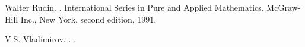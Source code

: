 \documentclass[italian,a4paper,oneside,headinclude]{scrbook}
\begin{document}

%
\begin{thebibliography}{1}

Walter Rudin.
.
\newblock International Series in Pure and Applied Mathematics. McGraw-Hill
  Inc., New York, second edition, 1991.

V.S. Vladimirov.
.
.

\end{thebibliography}

\end{document}
